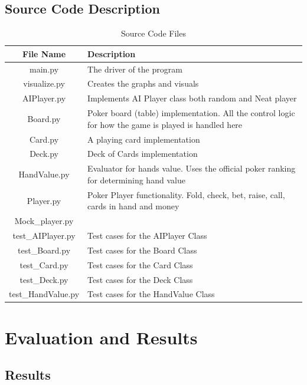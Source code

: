 \subsection{Source Code Description}
\begin{table}[H]
    \caption{Source Code Files}
    \centering
    \begin{tabular}{ | c | p{14cm} |}
    \hline
         File Name & Description \\
        \hline
        \hline
        main.py & The driver of the program\\ \hline
        visualize.py & Creates the graphs and visuals\\ \hline
        AIPlayer.py & Implements AI Player class both random and Neat player\\ \hline
        Board.py & Poker board (table) implementation. All the control logic for how the game is played is handled here\\ \hline
        Card.py & A playing card implementation\\ \hline
        Deck.py & Deck of Cards implementation\\ \hline
        HandValue.py & Evaluator for hands value. Uses the official poker ranking for determining hand value\\ \hline
        Player.py & Poker Player functionality. Fold, check, bet, raise, call, cards in hand and money\\
        Mock\_player.py & \\ \hline
        test\_AIPlayer.py & Test cases for the AIPlayer Class \\ \hline
        test\_Board.py & Test cases for the Board Class\\ \hline
        test\_Card.py & Test cases for the Card Class\\ \hline
        test\_Deck.py & Test cases for the Deck Class\\ \hline
        test\_HandValue.py & Test cases for the HandValue Class\\
        
    \hline
    \end{tabular}
    \label{tab:sourceCode}
\end{table}

\section{Evaluation and Results}

\subsection{Results}

